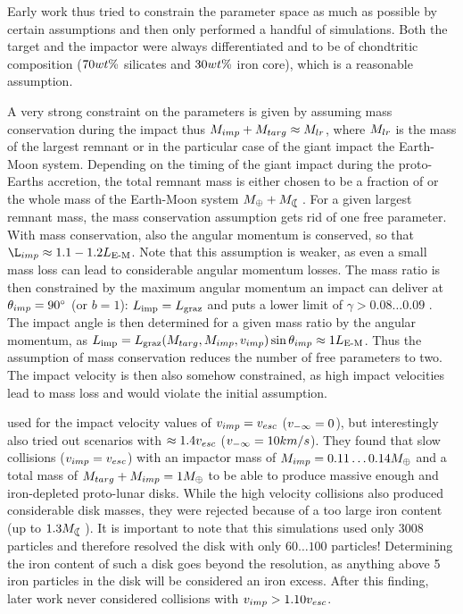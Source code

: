 Early work \citep{Benz:1985p1755, Benz:1989p1893, Cameron:2000p1854} thus tried to constrain the parameter space as much as possible by certain assumptions and then only performed a handful of simulations. Both the target and the impactor were always differentiated and to be of chondtritic composition ($70 wt\mathrm{\%}$ silicates and $30 wt\mathrm{\%}$ iron core), which is a reasonable assumption. 

A very strong constraint on the parameters is given by assuming mass conservation during the impact thus $M_{imp} + M_{targ} \approx M_{lr}$, where $M_{lr}$ is the mass of the largest remnant or in the particular case of the giant impact the Earth-Moon system. Depending on the timing of the giant impact during the proto-Earths accretion, the total remnant mass is either chosen to be a fraction of or the whole mass of the Earth-Moon system $\ME + \ML$. For a given largest remnant mass, the mass conservation assumption gets rid of one free parameter. With mass conservation, also the angular momentum is conserved, so that $\L_{imp} \approx 1.1 - 1.2 \lem$. Note that this assumption is weaker, as even a small mass loss can lead to considerable angular momentum losses. The mass ratio is then constrained by the maximum angular momentum an impact can deliver at $\theta_{imp} = 90 ^\circ$ (or $b = 1$): $L_{\textrm{imp}} = L_{\textrm{graz}}$ and puts a lower limit of $\gamma > 0.08 \dots 0.09$ \citep{Canup:2001p1861}. The impact angle is then determined for a given mass ratio by the angular momentum, as $L_{\textrm{imp}} = L_{\textrm{graz}} (M_{targ}, M_{imp}, v_{imp}) \sin{\theta_{imp}} \approx 1 L_{\textrm{E-M}}$. Thus the assumption of mass conservation reduces the number of free parameters to two. The impact velocity is then also somehow constrained, as high impact velocities lead to mass loss and would violate the initial assumption. 

\cite{Benz:1989p1893} used for the impact velocity values of $v_{imp} = v_{esc}$ ($v_{-\infty} = 0$), but interestingly also tried out scenarios with $\approx 1.4 v_{esc}$ ($v_{-\infty} = 10km/s$). They found that slow collisions ($v_{imp} = v_{esc}$) with an impactor mass of $M_{imp} = 0.11 \dots 0.14 M_{\oplus}$ and a total mass of $M_{targ} + M_{imp} = 1 M_{\oplus}$ to be able to produce massive enough and iron-depleted proto-lunar disks. While the high velocity collisions also produced considerable disk masses, they were rejected because of a too large iron content (up to $1.3 \ML$). It is important to note that this simulations used only $3008$ particles and therefore resolved the disk with only $60 \dots 100$ particles! Determining the iron content of such a disk goes beyond the resolution, as anything above 5 iron particles in the disk will be considered an iron excess. After this finding, later work never considered collisions with $v_{imp} > 1.10 v_{esc}$.

